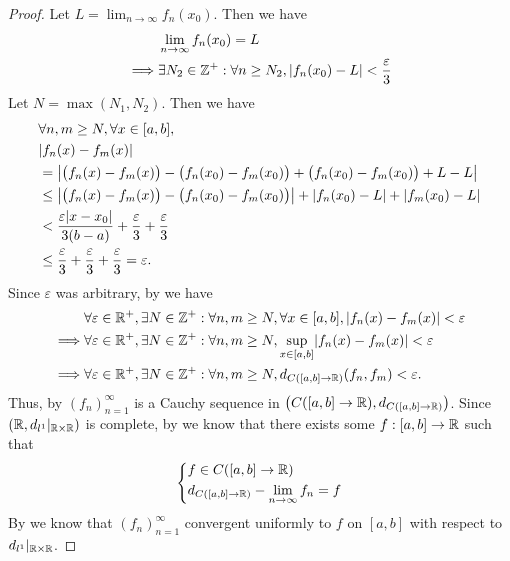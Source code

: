 \begin{proof}
  Let \(L = \lim_{n \to \infty} f_n(x_0)\).
  Then we have
  \begin{align*}
             & \lim_{n \to \infty} f_n(x_0) = L                                                       \\
    \implies & \exists N_2 \in \mathbb{Z}^+ : \forall n \geq N_2, \left\lvert f_n(x_0) - L\right\rvert < \dfrac{\varepsilon}{3}
  \end{align*}
  Let \(N = \max(N_1, N_2)\).
  Then we have
  \begin{align*}
     & \forall n, m \geq N, \forall x \in [a, b],                                                                     \\
     & \abs{f_n(x) - f_m(x)}                                                                                          \\
     & = \abs{\big(f_n(x) - f_m(x)\big) - \big(f_n(x_0) - f_m(x_0)\big) + \big(f_n(x_0) - f_m(x_0)\big) + L - L}      \\
     & \leq \abs{\big(f_n(x) - f_m(x)\big) - \big(f_n(x_0) - f_m(x_0)\big)} + \abs{f_n(x_0) - L} + \abs{f_m(x_0) - L} \\
     & < \dfrac{\varepsilon \abs{x - x_0}}{3(b - a)} + \dfrac{\varepsilon}{3} + \dfrac{\varepsilon}{3}                \\
     & \leq \dfrac{\varepsilon}{3} + \dfrac{\varepsilon}{3} + \dfrac{\varepsilon}{3} = \varepsilon.
  \end{align*}
  Since \(\varepsilon\) was arbitrary, by  we have
  \begin{align*}
             & \forall \varepsilon \in \R^+, \exists N \in \Z^+ : \forall n, m \geq N, \forall x \in [a, b], \abs{f_n(x) - f_m(x)} < \varepsilon \\
    \implies & \forall \varepsilon \in \R^+, \exists N \in \Z^+ : \forall n, m \geq N, \sup_{x \in [a, b]}\abs{f_n(x) - f_m(x)} < \varepsilon    \\
    \implies & \forall \varepsilon \in \R^+, \exists N \in \Z^+ : \forall n, m \geq N, d_{C([a, b] \to \R)}(f_n, f_m) < \varepsilon.
  \end{align*}
  Thus, by  \((f_n)_{n = 1}^\infty\) is a Cauchy sequence in \(\big(C([a, b] \to \mathbb{R}), d_{C([a, b] \to \mathbb{R})}\big)\).
  Since \((\mathbb{R}, d_{l^1}|_{\mathbb{R} \times \mathbb{R}})\) is complete, by  we know that there exists some \(f : [a, b] \to \mathbb{R}\) such that
  \[
    \begin{dcases}
      f \in C([a, b] \to \mathbb{R}) \\
      d_{C([a, b] \to \mathbb{R})} - \lim_{n \to \infty} f_n = f
    \end{dcases}
  \]
  By  we know that \((f_n)_{n = 1}^\infty\) convergent uniformly to \(f\) on \([a, b]\) with respect to \(d_{l^1}|_{\mathbb{R} \times \mathbb{R}}\).


\end{proof}
